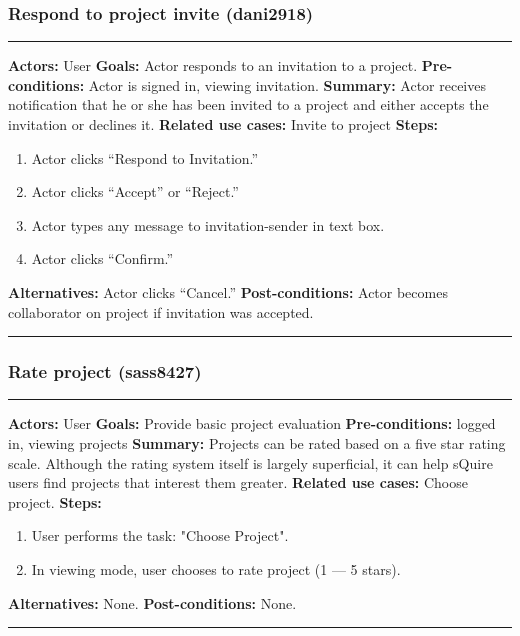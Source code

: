 \documentclass[11pt]{report}
\begin{document}
\subsubsection{Respond to project invite (dani2918)}
\vspace{2pt}
\hrule
\vspace{8pt}
 \textbf{Actors:} User  \newline
\textbf{Goals:} Actor responds to an invitation to a project.\newline
 \textbf{Pre-conditions:} Actor is signed in, viewing invitation.  \newline
\textbf{Summary:} Actor receives notification that he or she has been invited to a project and either accepts the invitation or declines it. \newline
\textbf{Related use cases:} Invite to project \newline
\textbf{Steps:} \begin{enumerate}
  \item Actor clicks ``Respond to Invitation.''
  \item Actor clicks ``Accept'' or ``Reject.''
  \item Actor types any message to invitation-sender in text box.
  \item Actor clicks ``Confirm.''
 \end{enumerate}
 \textbf{Alternatives:} Actor clicks ``Cancel.'' \newline
 \textbf{Post-conditions:} Actor becomes collaborator on project if invitation was accepted. \newline
\vspace{8pt}
\hrule
\newpage

\subsubsection{Rate project (sass8427)}
\vspace{2pt}
\hrule
\vspace{8pt}
 \textbf{Actors:} User \newline
\textbf{Goals:} Provide basic project evaluation \newline
 \textbf{Pre-conditions:} logged in, viewing projects \newline
\textbf{Summary:} Projects can be rated based on a five star rating scale. Although the rating system itself is largely superficial, it can help sQuire users find projects that interest them greater. \newline
\textbf{Related use cases:} Choose project.\newline
\textbf{Steps:} \begin{enumerate}
  \item User performs the task: "Choose Project".
  \item In viewing mode, user chooses to rate project (1 --- 5 stars).
 \end{enumerate}
 \textbf{Alternatives:} None. \newline
 \textbf{Post-conditions:} None. \newline
\vspace{8pt}
\hrule
\newpage
\end{document}
